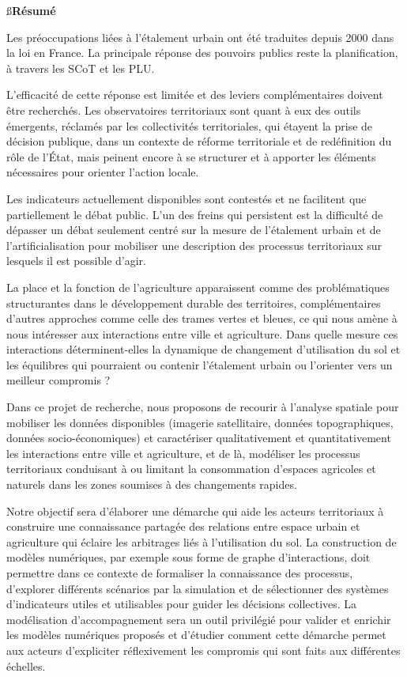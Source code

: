{\ss\bf Résumé}

Les préoccupations liées à l'étalement urbain ont été traduites depuis 2000
dans la loi en France.
La principale réponse des pouvoirs publics reste la planification,
à travers les SCoT et les PLU.

L'efficacité de cette réponse est limitée et des leviers complémentaires
doivent être recherchés.
Les observatoires territoriaux sont quant à eux des outils émergents, réclamés
par les collectivités territoriales, qui étayent la prise de décision publique,
dans un contexte de réforme territoriale et de redéfinition du rôle de l'État,
mais peinent encore à se structurer et à apporter les éléments nécessaires
pour orienter l'action locale.

Les indicateurs actuellement disponibles sont contestés et ne facilitent que
partiellement le débat public. L'un des freins qui persistent est la difficulté
de dépasser un débat seulement centré sur la mesure de l'étalement urbain
et de l’artificialisation pour mobiliser une description
des processus territoriaux sur lesquels il est possible d’agir.

La place et la fonction de l'agriculture apparaissent comme des problématiques
structurantes dans le développement durable des territoires,
complémentaires d'autres approches comme celle des trames vertes et bleues,
ce qui nous amène à nous intéresser aux interactions entre ville et agriculture.
Dans quelle mesure ces interactions déterminent-elles la dynamique de changement
d’utilisation du sol et les équilibres qui pourraient ou contenir
l’étalement urbain ou l’orienter vers un meilleur compromis ?

Dans ce projet de recherche, nous proposons de recourir à l'analyse spatiale
pour mobiliser les données disponibles (imagerie satellitaire,
données topographiques, données socio-économiques) et caractériser
qualitativement et quantitativement les interactions entre ville et agriculture,
et de là, modéliser les processus territoriaux conduisant à ou limitant
la consommation d'espaces agricoles et naturels dans les zones soumises à
des changements rapides.

Notre objectif sera d’élaborer une démarche qui aide les acteurs territoriaux
à construire une connaissance partagée des relations entre espace urbain et
agriculture qui éclaire les arbitrages liés à l'utilisation du sol.
La construction de modèles numériques, par exemple sous forme de
graphe d’interactions, doit permettre dans ce contexte de formaliser
la connaissance des processus, d’explorer différents scénarios par la simulation
et de sélectionner des systèmes d'indicateurs utiles et utilisables pour guider
les décisions collectives. La modélisation d’accompagnement sera un outil
privilégié pour valider et enrichir les modèles numériques proposés et d’étudier
comment cette démarche permet aux acteurs d'expliciter réflexivement
les compromis qui sont faits aux différentes échelles.

